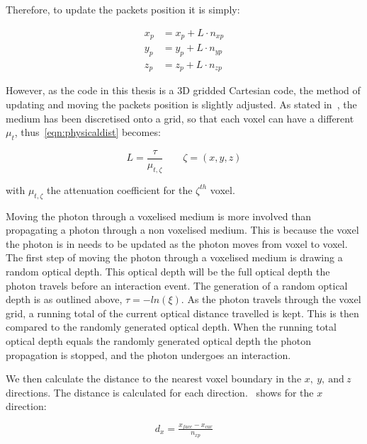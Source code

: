 Therefore, to update the packets position it is simply:

\begin{align}
x_p &= x_p+L\cdot n_{xp}\label{eqn:update1}\\
y_p &= y_p+L\cdot n_{yp}\label{eqn:update2}\\
z_p &= z_p+L\cdot n_{zp}\label{eqn:update3}
\end{align}

However, as the code in this thesis is a 3D gridded Cartesian code, the method of updating and moving the packets position is slightly adjusted. As stated in~, the medium has been discretised onto a grid, so that each voxel can have a different $\mu_t$, thus~\cref{eqn:physicaldist} becomes:

\begin{equation}
L=\frac{\tau}{\mu_{t,\zeta}}\quad\quad \zeta=(x,y,z)
\label{eqn:voxeloptdist}
\end{equation}

with $\mu_{t,\zeta}$ the attenuation coefficient for the $\zeta^{th}$ voxel. 

\medskip

Moving the photon through a voxelised medium is more involved than propagating a photon through a non voxelised medium. 
This is because the voxel the photon is in needs to be updated as the photon moves from voxel to voxel.
The first step of moving the photon through a voxelised medium is drawing a random optical depth.
This optical depth will be the full optical depth the photon travels before an interaction event.
The generation of a random optical depth is as outlined above, $\tau=-ln(\xi)$.
As the photon travels through the voxel grid, a running total of the current optical distance travelled is kept.
This is then compared to the randomly generated optical depth.
When the running total optical depth equals the randomly generated optical depth the photon propagation is stopped, and the photon undergoes an interaction.

We then calculate the distance to the nearest voxel boundary in the $x,\ y,\ \text{and}\ z$ directions.
The distance is calculated for each direction.~ shows for the $x$ direction:

\begin{equation}
d_{x} = \tfrac{x_{face} - x_{cur}}{n_{xp}}
\label{eqn:walldist}
\end{equation}

